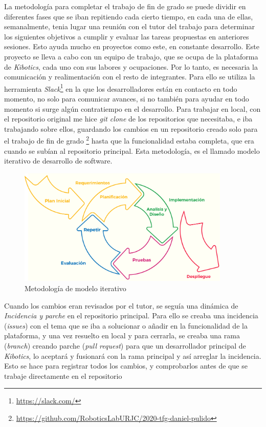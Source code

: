 La metodología para completar el trabajo de fin de grado se puede dividir en diferentes fases que se iban repitiendo cada cierto tiempo, en cada una de ellas, semanalmente, tenia lugar una reunión con el tutor del trabajo para determinar los siguientes objetivos a cumplir y evaluar las tareas propuestas en anteriores sesiones. Esto ayuda mucho en proyectos como este, en constante desarrollo.\newline
Este proyecto se lleva a cabo con un equipo de trabajo, que se ocupa de la plataforma de \textit{Kibotics}, cada uno con sus labores y ocupaciones. Por lo tanto, es necesaria la comunicación y realimentación con el resto de integrantes. Para ello se utiliza la herramienta \textit{Slack}\footnote{\url{https://slack.com/}} en la que los desarrolladores están en contacto en todo momento, no solo para comunicar avances, si no también para ayudar en todo momento si surge algún contratiempo en el desarrollo.\newline
Para trabajar en local, con el repositorio original me hice \textit{git clone} de los repositorios que necesitaba, e iba trabajando sobre ellos, guardando los cambios en un repositorio creado solo para el trabajo de fin de grado \footnote{\url{https://github.com/RoboticsLabURJC/2020-tfg-daniel-pulido}} hasta que la funcionalidad estaba completa, que era cuando se subían al repositorio principal. Esta metodología, es el llamado modelo iterativo de desarrollo de software.



 \begin{figure}[H]
    \centering
    \includegraphics[width=0.9\textwidth]{img/metodoiterativo.png}
    \caption{Metodología de modelo iterativo} \label{fig:metodo}
\end{figure}

Cuando los cambios eran revisados por el tutor, se seguía una dinámica de \textit{Incidencia y parche} en el repositorio principal. Para ello se creaba una incidencia (\textit{issues}) con el tema que se iba a solucionar o añadir en la funcionalidad de la plataforma, y una vez resuelto en local y para cerrarla, se creaba una rama (\textit{branch}) creando parche (\textit{pull request}) para que un desarrollador principal de \textit{Kibotics}, lo aceptará y fusionará con la rama principal y así arreglar la incidencia. Esto se hace para registrar todos los cambios, y comprobarlos antes de que se trabaje directamente en el repositorio



